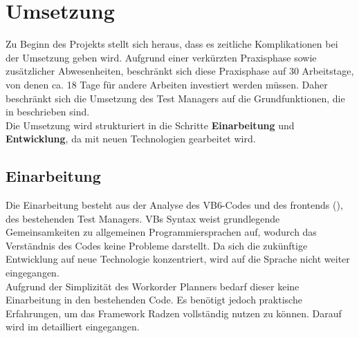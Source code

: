 
\chapter{Umsetzung}
Zu Beginn des Projekts stellt sich heraus, dass es zeitliche Komplikationen bei der Umsetzung geben wird. Aufgrund einer verkürzten Praxisphase sowie zusätzlicher Abwesenheiten, beschränkt sich diese Praxisphase auf 30 Arbeitstage, von denen ca. 18 Tage für andere Arbeiten investiert werden müssen. Daher beschränkt sich die Umsetzung des Test Managers auf die Grundfunktionen, die in  beschrieben sind.\\
Die Umsetzung wird strukturiert in die Schritte \textbf{Einarbeitung} und \textbf{Entwicklung}, da mit neuen Technologien gearbeitet wird.
\section{Einarbeitung}
Die Einarbeitung besteht aus der Analyse des \gls{VB}6-Codes und des \glspl{frontend} (), des bestehenden Test Managers. \gls{VB}s Syntax weist grundlegende Gemeinsamkeiten zu allgemeinen Programmiersprachen auf, wodurch das Verständnis des Codes keine Probleme darstellt. Da sich die zukünftige Entwicklung auf neue Technologie konzentriert, wird auf die Sprache nicht weiter eingegangen.\\

\noindent Aufgrund der Simplizität des Workorder Planners bedarf dieser keine Einarbeitung in den bestehenden Code. Es benötigt jedoch praktische Erfahrungen, um das Framework Radzen vollständig nutzen zu können. Darauf wird im  detailliert eingegangen.

\glsdisablehyper %
